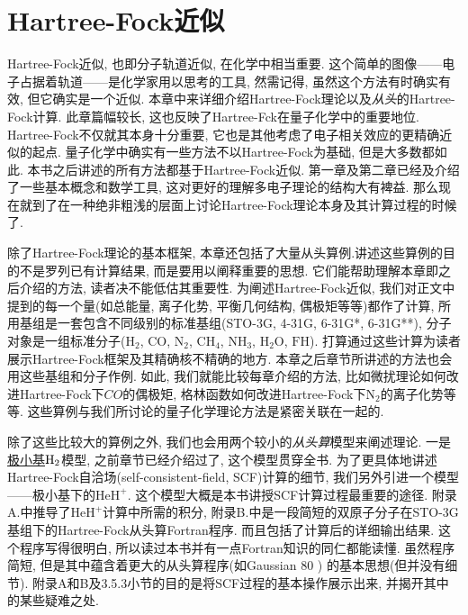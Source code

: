 \chapter{Hartree-Fock近似}
Hartree-Fock近似, 也即分子轨道近似, 在化学中相当重要. 这个简单的图像——电子占据着轨道——是化学家用以思考的工具, 然需记得, 虽然这个方法有时确实有效, 但它确实是一个近似. 本章中来详细介绍Hartree-Fock理论以及\emph{从头}的Hartree-Fock计算. 此章篇幅较长, 这也反映了Hartree-Fck在量子化学中的重要地位. Hartree-Fock不仅就其本身十分重要, 它也是其他考虑了电子相关效应的更精确近似的起点. 量子化学中确实有一些方法不以Hartree-Fock为基础, 但是大多数都如此. 本书之后讲述的所有方法都基于Hartree-Fock近似. 第一章及第二章已经及介绍了一些基本概念和数学工具, 这对更好的理解多电子理论的结构大有裨益. 那么现在就到了在一种绝非粗浅的层面上讨论Hartree-Fock理论本身及其计算过程的时候了.  

除了Hartree-Fock理论的基本框架, 本章还包括了大量从头算例.讲述这些算例的目的不是罗列已有计算结果, 而是要用以阐释重要的思想. 它们能帮助理解本章即之后介绍的方法, 读者决不能低估其重要性. 为阐述Hartree-Fock近似, 我们对正文中提到的每一个量(如总能量, 离子化势, 平衡几何结构, 偶极矩等等)都作了计算, 所用基组是一套包含不同级别的标准基组(STO-3G, 4-31G, 6-31G*, 6-31G**), 分子对象是一组标准分子($\mathrm{H}_2$, $\mathrm{CO}$, $\mathrm{N}_2$, $\mathrm{CH}_4$, $\mathrm{NH}_3$, $\mathrm{H}_2\mathrm{O}$, $\mathrm{FH}$). 打算通过这些计算为读者展示Hartree-Fock框架及其精确核不精确的地方. 本章之后章节所讲述的方法也会用这些基组和分子作例. 如此, 我们就能比较每章介绍的方法, 比如微扰理论如何改进Hartree-Fock下$CO$的偶极矩, 格林函数如何改进Hartree-Fock下$\mathrm{N}_2$的离子化势等等. 这些算例与我们所讨论的量子化学理论方法是紧密关联在一起的.

除了这些比较大的算例之外, 我们也会用两个较小的\emph{从头算}模型来阐述理论. 一是\underline{极小基$\mathrm{H}_2$}模型, 之前章节已经介绍过了, 这个模型贯穿全书. 为了更具体地讲述Hartree-Fock自洽场(self-consistent-field, SCF)计算的细节, 我们另外引进一个模型——极小基下的$\mathrm{HeH}^+$. 这个模型大概是本书讲授SCF计算过程最重要的途径. 附录A.中推导了$\mathrm{HeH}^+$计算中所需的积分, 附录B.中是一段简短的双原子分子在STO-3G基组下的Hartree-Fock从头算Fortran程序. 而且包括了计算后的详细输出结果. 这个程序写得很明白, 所以读过本书并有一点Fortran知识的同仁都能读懂. 虽然程序简短, 但是其中蕴含着更大的从头算程序(如Gaussian 80
)
的基本思想(但并没有细节). 附录A和B及3.5.3小节的目的是将SCF过程的基本操作展示出来, 并揭开其中的某些疑难之处.

